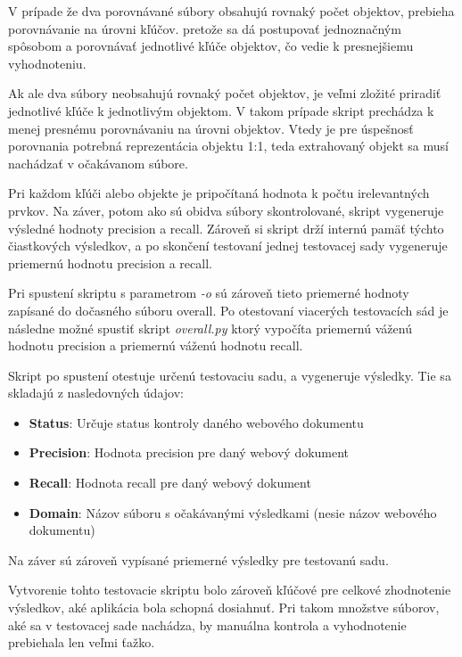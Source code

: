 V prípade že dva porovnávané súbory obsahujú rovnaký počet objektov, prebieha porovnávanie na úrovni kľúčov. pretože sa dá postupovať jednoznačným spôsobom a porovnávať jednotlivé kľúče objektov, čo vedie k presnejšiemu vyhodnoteniu. 

Ak ale dva súbory neobsahujú rovnaký počet objektov, je veľmi zložité priradiť jednotlivé kľúče k jednotlivým objektom. V takom prípade skript prechádza k menej presnému porovnávaniu na úrovni objektov. Vtedy je pre úspešnosť porovnania potrebná reprezentácia objektu 1:1, teda extrahovaný objekt sa musí nachádzať v očakávanom súbore.

Pri každom kľúči alebo objekte je pripočítaná hodnota k počtu irelevantných prvkov. Na záver, potom ako sú obidva súbory skontrolované, skript vygeneruje výsledné hodnoty precision a recall. Zároveň si skript drží internú pamäť týchto čiastkových výsledkov, a po skončení testovaní jednej testovacej sady vygeneruje priemernú hodnotu precision a recall.

Pri spustení skriptu s parametrom \textit{-o} sú zároveň tieto priemerné hodnoty zapísané do dočasného súboru overall. Po otestovaní viacerých testovacích sád je následne možné spustiť skript \textit{overall.py} ktorý vypočíta priemernú váženú hodnotu precision a priemernú váženú hodnotu recall.

\bigskip

Skript po spustení otestuje určenú testovaciu sadu, a vygeneruje výsledky. Tie sa skladajú z nasledovných údajov:

\begin{itemize}
    \item \textbf{Status}: Určuje status kontroly daného webového dokumentu
    \item \textbf{Precision}: Hodnota precision pre daný webový dokument
    \item \textbf{Recall}: Hodnota recall pre daný webový dokument
    \item \textbf{Domain}: Názov súboru s očakávanými výsledkami (nesie názov webového dokumentu)
\end{itemize}

\bigskip

Na záver sú zároveň vypísané priemerné výsledky pre testovanú sadu.

\bigskip

Vytvorenie tohto testovacie skriptu bolo zároveň kľúčové pre celkové zhodnotenie výsledkov, aké aplikácia bola schopná dosiahnuť. Pri takom množstve súborov, aké sa v testovacej sade nachádza, by manuálna kontrola a vyhodnotenie prebiehala len veľmi ťažko.

